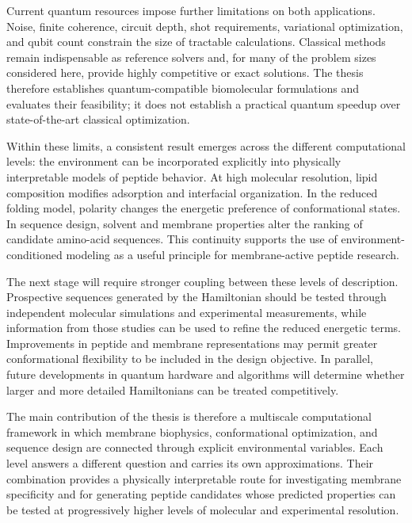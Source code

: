 Current quantum resources impose further limitations on both applications. Noise, finite coherence, circuit depth, shot requirements, variational optimization, and qubit count constrain the size of tractable calculations. Classical methods remain indispensable as reference solvers and, for many of the problem sizes considered here, provide highly competitive or exact solutions. The thesis therefore establishes quantum-compatible biomolecular formulations and evaluates their feasibility; it does not establish a practical quantum speedup over state-of-the-art classical optimization.

Within these limits, a consistent result emerges across the different computational levels: the environment can be incorporated explicitly into physically interpretable models of peptide behavior. At high molecular resolution, lipid composition modifies adsorption and interfacial organization. In the reduced folding model, polarity changes the energetic preference of conformational states. In sequence design, solvent and membrane properties alter the ranking of candidate amino-acid sequences. This continuity supports the use of environment-conditioned modeling as a useful principle for membrane-active peptide research.

The next stage will require stronger coupling between these levels of description. Prospective sequences generated by the Hamiltonian should be tested through independent molecular simulations and experimental measurements, while information from those studies can be used to refine the reduced energetic terms. Improvements in peptide and membrane representations may permit greater conformational flexibility to be included in the design objective. In parallel, future developments in quantum hardware and algorithms will determine whether larger and more detailed Hamiltonians can be treated competitively.

The main contribution of the thesis is therefore a multiscale computational framework in which membrane biophysics, conformational optimization, and sequence design are connected through explicit environmental variables. Each level answers a different question and carries its own approximations. Their combination provides a physically interpretable route for investigating membrane specificity and for generating peptide candidates whose predicted properties can be tested at progressively higher levels of molecular and experimental resolution.
